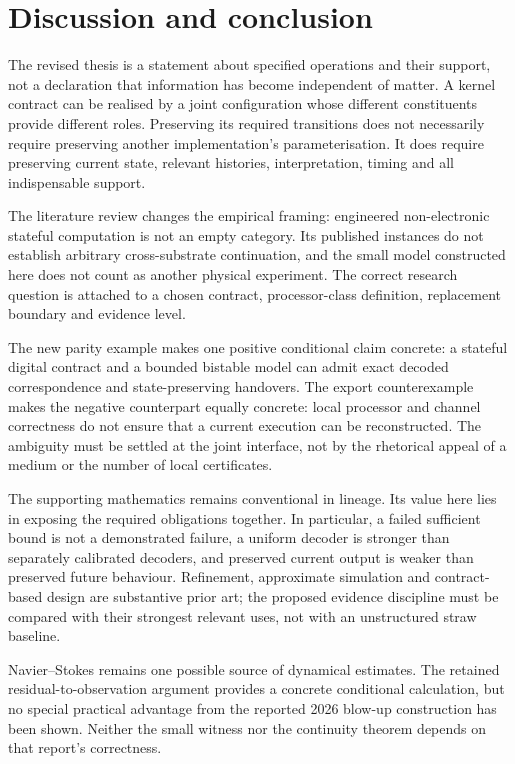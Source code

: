 \documentclass[11pt,a4paper]{article}
\theoremstyle{definition}
\theoremstyle{remark}
\begin{document}
\section{Discussion and conclusion}\label{sec:conclusion}
The revised thesis is a statement about specified operations and their support, not a declaration that information has become independent of matter. A kernel contract can be realised by a joint configuration whose different constituents provide different roles. Preserving its required transitions does not necessarily require preserving another implementation's parameterisation. It does require preserving current state, relevant histories, interpretation, timing and all indispensable support.

The literature review changes the empirical framing: engineered non-electronic stateful computation is not an empty category. Its published instances do not establish arbitrary cross-substrate continuation, and the small model constructed here does not count as another physical experiment. The correct research question is attached to a chosen contract, processor-class definition, replacement boundary and evidence level.

The new parity example makes one positive conditional claim concrete: a stateful digital contract and a bounded bistable model can admit exact decoded correspondence and state-preserving handovers. The export counterexample makes the negative counterpart equally concrete: local processor and channel correctness do not ensure that a current execution can be reconstructed. The ambiguity must be settled at the joint interface, not by the rhetorical appeal of a medium or the number of local certificates.

The supporting mathematics remains conventional in lineage. Its value here lies in exposing the required obligations together. In particular, a failed sufficient bound is not a demonstrated failure, a uniform decoder is stronger than separately calibrated decoders, and preserved current output is weaker than preserved future behaviour. Refinement, approximate simulation and contract-based design are substantive prior art; the proposed evidence discipline must be compared with their strongest relevant uses, not with an unstructured straw baseline.

Navier--Stokes remains one possible source of dynamical estimates. The retained residual-to-observation argument provides a concrete conditional calculation, but no special practical advantage from the reported 2026 blow-up construction has been shown. Neither the small witness nor the continuity theorem depends on that report's correctness.
\end{document}
